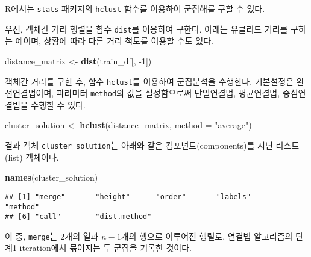 \documentclass[]{book}
\newenvironment{Shaded}{\begin{snugshade}}{\end{snugshade}}
\newcommand{\DataTypeTok}[1]{\textcolor[rgb]{0.13,0.29,0.53}{#1}}
\newcommand{\DecValTok}[1]{\textcolor[rgb]{0.00,0.00,0.81}{#1}}
\newcommand{\KeywordTok}[1]{\textcolor[rgb]{0.13,0.29,0.53}{\textbf{#1}}}
\newcommand{\NormalTok}[1]{#1}
\newcommand{\OperatorTok}[1]{\textcolor[rgb]{0.81,0.36,0.00}{\textbf{#1}}}
\newcommand{\StringTok}[1]{\textcolor[rgb]{0.31,0.60,0.02}{#1}}
\begin{document}
R에서는 \texttt{stats} 패키지의 \texttt{hclust} 함수를 이용하여 군집해를 구할 수 있다.

우선, 객체간 거리 행렬을 함수 \texttt{dist}를 이용하여 구한다. 아래는 유클리드 거리를 구하는 예이며, 상황에 따라 다른 거리 척도를 이용할 수도 있다.

\begin{Shaded}
\begin{Highlighting}[]
\NormalTok{distance_matrix <-}\StringTok{ }\KeywordTok{dist}\NormalTok{(train_df[, }\DecValTok{-1}\NormalTok{])}
\end{Highlighting}
\end{Shaded}

객체간 거리를 구한 후, 함수 \texttt{hclust}를 이용하여 군집분석을 수행한다. 기본설정은 완전연결법이며, 파라미터 \texttt{method}의 값을 설정함으로써 단일연결법, 평균연결법, 중심연결법을 수행할 수 있다.

\begin{Shaded}
\begin{Highlighting}[]
\NormalTok{cluster_solution <-}\StringTok{ }\KeywordTok{hclust}\NormalTok{(distance_matrix, }\DataTypeTok{method =} \StringTok{"average"}\NormalTok{)}
\end{Highlighting}
\end{Shaded}

결과 객체 \texttt{cluster\_solution}는 아래와 같은 컴포넌트(components)를 지닌 리스트(list) 객체이다.

\begin{Shaded}
\begin{Highlighting}[]
\KeywordTok{names}\NormalTok{(cluster_solution)}
\end{Highlighting}
\end{Shaded}

\begin{verbatim}
## [1] "merge"       "height"      "order"       "labels"      "method"     
## [6] "call"        "dist.method"
\end{verbatim}

이 중, \texttt{merge}는 2개의 열과 \(n - 1\)개의 행으로 이루어진 행렬로, 연결법 알고리즘의 단계1 iteration에서 묶어지는 두 군집을 기록한 것이다.

\begin{Shaded}
\end{Shaded}
\end{document}
